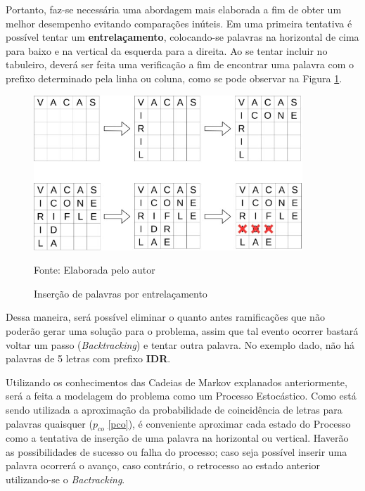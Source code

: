 
Portanto, faz-se necessária uma abordagem mais elaborada a fim de obter um melhor desempenho evitando comparações inúteis. Em uma primeira tentativa é possível tentar um \textbf{entrelaçamento}, colocando-se palavras na horizontal de cima para baixo e na vertical da esquerda para a direita. Ao se tentar incluir no tabuleiro, deverá ser feita uma verificação a fim de encontrar uma palavra com o prefixo determinado pela linha ou coluna, como se pode observar na Figura \ref{fig:entrelacamento}. 

\begin{figure}[H] 
\centering
    \caption{Inserção de palavras por entrelaçamento}
    \label{fig:entrelacamento}
    \includegraphics[width=0.9\textwidth]{Figuras/entrelacamento.jpg}
    
    Fonte: Elaborada pelo autor
\end{figure}

Dessa maneira, será possível eliminar o quanto antes ramificações que não poderão gerar uma solução para o problema, assim que tal evento ocorrer bastará voltar um passo (\textit{Backtracking}) e tentar outra palavra. No exemplo dado, não há palavras de 5 letras com prefixo \textbf{IDR}.


Utilizando os conhecimentos das Cadeias de Markov explanados anteriormente, será a feita a modelagem do problema como um Processo Estocástico. Como está sendo utilizada a aproximação da probabilidade de coincidência de letras para palavras quaisquer ($p_{co}$ \ref{pco}), é conveniente aproximar cada estado do Processo como a tentativa de inserção de uma palavra na horizontal ou vertical. Haverão as possibilidades de sucesso ou falha do processo; caso seja possível inserir uma palavra ocorrerá o avanço, caso contrário, o retrocesso ao estado anterior utilizando-se o \textit{Bactracking}. 


